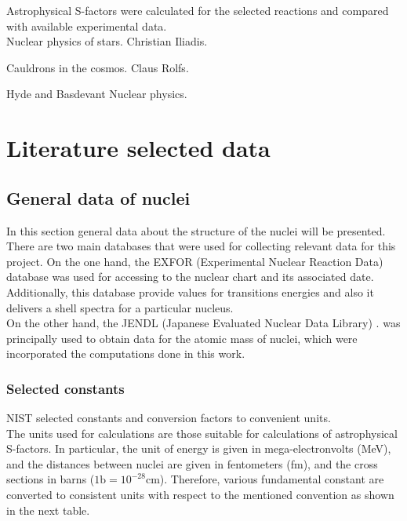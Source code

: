 \documentclass[openany]{book}
\begin{document}
Astrophysical S-factors were calculated for the selected reactions and compared with available experimental data.  \\

Nuclear physics of stars. Christian Iliadis.

\vspace{1in}
Cauldrons in the cosmos.  Claus Rolfs.

\vspace{1in}
Hyde and Basdevant Nuclear physics.

\appendix

\chapter{Literature selected data} \label{ap:literatureData}

\section{General data of nuclei} \label{sec:nucleiData}

In this section general data about the structure of the nuclei will be presented. There are two main databases that were used for collecting relevant data for this project. On the one hand, the EXFOR (Experimental Nuclear Reaction Data) database \cite{zerkin_pritychenko_totans_vrapcenjak_rodionov_shulyak_2022} was used for accessing to the nuclear chart and its associated date. Additionally, this database provide values for transitions energies and also it delivers a shell spectra for a particular nucleus. \\

On the other hand, the JENDL (Japanese Evaluated Nuclear Data Library) \cite{iwamoto_iwamoto_shibata_ichihara_kunieda_minato_nakayama_2020}. was principally used to obtain data for the atomic mass of nuclei, which were incorporated the computations done in this work. 

\subsection{Selected constants} \label{sub:selectedConstants}

NIST selected constants and conversion factors to convenient units. \\

The units used for calculations are those suitable for calculations of astrophysical S-factors. In particular, the unit of energy is given in mega-electronvolts (MeV), and the distances between nuclei are given in fentometers (fm), and the cross sections in barns ($\mathrm{1b = 10^{-28}cm}$). Therefore, various fundamental constant are converted to consistent units with respect to the mentioned convention as shown in the next table. \\
\end{document}

